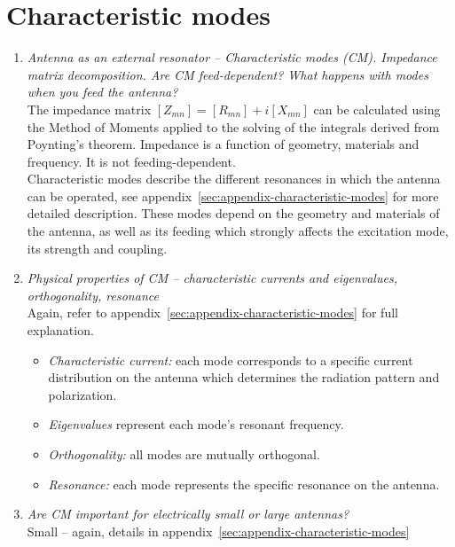 \documentclass[11pt,a4paper]{article}
\begin{document}
\newpage\section{Characteristic modes}
\begin{enumerate}
    \item \emph{Antenna as an external resonator -- Characteristic modes (CM). Impedance matrix decomposition. Are CM feed-dependent? What happens with modes when you feed the antenna?}\\
    The impedance matrix $[Z_{mn}] = [R_{mn}] + i[X_{mn}]$ can be calculated using the Method of Moments applied to the solving of the integrals derived from Poynting's theorem. Impedance is a function of geometry, materials and frequency. It is not feeding-dependent.\\
    Characteristic modes describe the different resonances in which the antenna can be operated, see appendix~\ref{sec:appendix-characteristic-modes} for more detailed description. These modes depend on the geometry and materials of the antenna, as well as its feeding which strongly affects the excitation mode, its strength and coupling.

    \item \emph{Physical properties of CM -- characteristic currents and eigenvalues, orthogonality, resonance}\\
    Again, refer to appendix~\ref{sec:appendix-characteristic-modes} for full explanation.
    \begin{itemize}
        \item \emph{Characteristic current:} each mode corresponds to a specific current distribution on the antenna which determines the radiation pattern and polarization.
        \item \emph{Eigenvalues} represent each mode's resonant frequency.
        \item \emph{Orthogonality:} all modes are mutually orthogonal.
        \item \emph{Resonance:} each mode represents the specific resonance on the antenna.
    \end{itemize}

    \item \emph{Are CM important for electrically small or large antennas?}\\
    Small -- again, details in appendix~\ref{sec:appendix-characteristic-modes}


\end{enumerate}
\end{document}
